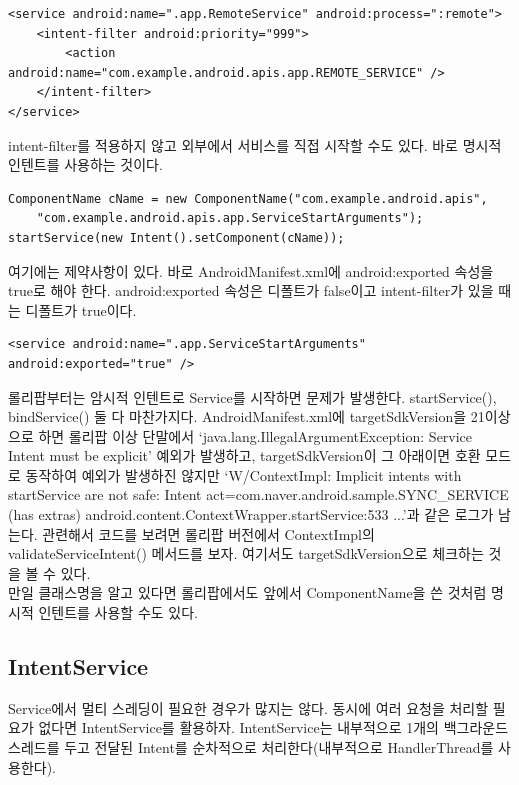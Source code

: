 \begin{lstlisting}[frame=single]
<service android:name=".app.RemoteService" android:process=":remote">
	<intent-filter android:priority="999">
		<action android:name="com.example.android.apis.app.REMOTE_SERVICE" />
	</intent-filter>
</service>
\end{lstlisting}

intent-filter를 적용하지 않고 외부에서 서비스를 직접 시작할 수도 있다. 바로 명시적 인텐트를 사용하는 것이다.
\begin{lstlisting}[frame=single]
ComponentName cName = new ComponentName("com.example.android.apis",
	"com.example.android.apis.app.ServiceStartArguments");
startService(new Intent().setComponent(cName));
\end{lstlisting}

여기에는 제약사항이 있다. 바로 AndroidManifest.xml에 android:exported 속성을 true로 해야 한다. android:exported 속성은 디폴트가 false이고 intent-filter가 있을 때는 디폴트가 true이다.
\begin{lstlisting}[frame=single]
<service android:name=".app.ServiceStartArguments" android:exported="true" />
\end{lstlisting}

롤리팝부터는 암시적 인텐트로 Service를 시작하면 문제가 발생한다. startService(), bindService() 둘 다 마찬가지다.
AndroidManifest.xml에 targetSdkVersion을 21이상으로 하면 롤리팝 이상 단말에서 `java.lang.IllegalArgu\-mentException: Service Intent must be explicit'  예외가 발생하고, targetSdkVersion이 그 아래이면 호환 모드로 동작하여 예외가 발생하진 않지만 `W/ContextImpl: Implicit intents with startService are not safe: Intent { act=com.naver.android.sample.SYNC\_SERVICE (has extras) } android.content.ContextWrapper.startService:533 ...'과 같은 로그가 남는다. 
관련해서 코드를 보려면 롤리팝 버전에서 ContextImpl의 validateServiceIntent() 메서드를 보자. 여기서도 targetSdkVersion으로 체크하는 것을 볼 수 있다.\\

만일 클래스명을 알고 있다면 롤리팝에서도 앞에서 ComponentName을 쓴 것처럼 명시적 인텐트를 사용할 수도 있다.

\subsection{IntentService}
Service에서 멀티 스레딩이 필요한 경우가 많지는 않다. 동시에 여러 요청을 처리할 필요가 없다면 IntentService를 활용하자.
IntentService는 내부적으로 1개의 백그라운드 스레드를 두고 전달된 Intent를 순차적으로 처리한다(내부적으로 HandlerThread를 사용한다).\\

